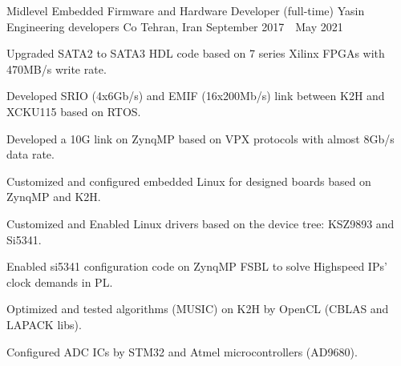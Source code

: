 \begin{cventries}
  \cventry
    {Midlevel Embedded Firmware and Hardware Developer (full-time)} %
    {Yasin Engineering developers Co} %
    {Tehran, Iran} %
    {September 2017~\textendash~May 2021} %
    {
      \begin{cvitems} %
        \item {Upgraded SATA2 to SATA3 HDL code based on 7 series Xilinx FPGAs with 470MB/s write rate.}
        \item {Developed SRIO (4x6Gb/s) and EMIF (16x200Mb/s) link between K2H and XCKU115 based on RTOS.}
	      \item {Developed a 10G link on ZynqMP based on VPX protocols with almost 8Gb/s data rate.}
        \item {Customized and configured embedded Linux for designed boards based on ZynqMP and K2H.}
	      \item {Customized and Enabled Linux drivers based on the device tree: KSZ9893 and Si5341.}
        \item {Enabled si5341 configuration code on ZynqMP FSBL to solve Highspeed IPs' clock demands in PL.}
	      \item {Optimized and tested algorithms (MUSIC) on K2H by OpenCL (CBLAS and LAPACK libs).}
	      \item {Configured ADC ICs by STM32 and Atmel microcontrollers (AD9680).}
      \end{cvitems}
    }


\end{cventries}
